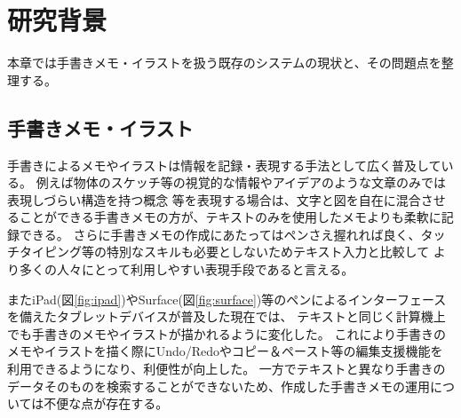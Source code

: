 \chapter{研究背景}
\label{chap:haikei}

本章では手書きメモ・イラストを扱う既存のシステムの現状と、その問題点を整理する。

\newpage


\section{手書きメモ・イラスト}
手書きによるメモやイラストは情報を記録・表現する手法として広く普及している。
例えば物体のスケッチ等の視覚的な情報やアイデアのような文章のみでは表現しづらい構造を持つ概念
等を表現する場合は、文字と図を自在に混合させることができる手書きメモの方が、テキストのみを使用したメモよりも柔軟に記録できる。
さらに手書きメモの作成にあたってはペンさえ握れれば良く、タッチタイピング等の特別なスキルも必要としないためテキスト入力と比較して
より多くの人々にとって利用しやすい表現手段であると言える。

またiPad(図\ref{fig:ipad})やSurface(図\ref{fig:surface})等のペンによるインターフェースを備えたタブレットデバイスが普及した現在では、
テキストと同じく計算機上でも手書きのメモやイラストが描かれるように変化した。
これにより手書きのメモやイラストを描く際にUndo/Redoやコピー＆ペースト等の編集支援機能を利用できるようになり、利便性が向上した。
一方でテキストと異なり手書きのデータそのものを検索することができないため、作成した手書きメモの運用については不便な点が存在する。

